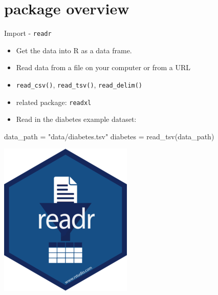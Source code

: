 \documentclass[
  ignorenonframetext,
]{beamer}
\newenvironment{Shaded}{\begin{snugshade}}{\end{snugshade}}
\newcommand{\FunctionTok}[1]{\textcolor[rgb]{0.00,0.00,0.00}{#1}}
\newcommand{\NormalTok}[1]{#1}
\newcommand{\OtherTok}[1]{\textcolor[rgb]{0.56,0.35,0.01}{#1}}
\newcommand{\StringTok}[1]{\textcolor[rgb]{0.31,0.60,0.02}{#1}}
\providecommand{\tightlist}{%
  \setlength{\itemsep}{0pt}\setlength{\parskip}{0pt}}
\begin{document}
\hypertarget{package-overview}{%
\section{package overview}\label{package-overview}}

\begin{frame}[fragile]{Import - \texttt{readr}}
\protect\hypertarget{import---readr}{}
\begin{itemize}
\tightlist
\item
  Get the data into R as a data frame.
\item
  Read data from a file on your computer or from a URL
\item
  \texttt{read\_csv()}, \texttt{read\_tsv()}, \texttt{read\_delim()}
\item
  related package: \texttt{readxl}
\item
  Read in the diabetes example dataset:
\end{itemize}

\begin{Shaded}
\begin{Highlighting}[]
\NormalTok{data\_path }\OtherTok{=} \StringTok{"data/diabetes.tsv"}
\NormalTok{diabetes }\OtherTok{=} \FunctionTok{read\_tsv}\NormalTok{(data\_path)}
\end{Highlighting}
\end{Shaded}

\includegraphics[width=0.9\linewidth]{images/readr}
\end{frame}
\end{document}
